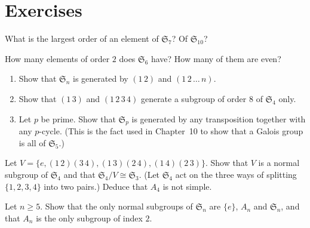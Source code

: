 \section{Exercises}

\begin{exercise}[$\star$]\label{ex:landau}
What is the largest order of an element of $\mathfrak S_7$? Of $\mathfrak S_{10}$?
\end{exercise}

\begin{exercise}[$\star$]\label{ex:order2}
How many elements of order $2$ does $\mathfrak S_6$ have? How many of them are even?
\end{exercise}

\begin{exercise}[$\star\star$]\label{ex:gens12n}
\begin{enumerate}[label=(\alph*)]
\item Show that $\mathfrak S_n$ is generated by $(1\,2)$ and $(1\,2\,\dots\,n)$.
\item Show that $(1\,3)$ and $(1\,2\,3\,4)$ generate a subgroup of order $8$ of $\mathfrak S_4$ only.
\item Let $p$ be prime. Show that $\mathfrak S_p$ is generated by any transposition together with any $p$-cycle. (This is the fact used in Chapter~10 to show that a Galois group is all of $\mathfrak S_5$.)
\end{enumerate}
\end{exercise}

\begin{exercise}[$\star\star$]\label{ex:v4}
Let $V=\{e,(1\,2)(3\,4),(1\,3)(2\,4),(1\,4)(2\,3)\}$. Show that $V$ is a normal subgroup of $\mathfrak S_4$ and that $\mathfrak S_4/V\cong\mathfrak S_3$. (Let $\mathfrak S_4$ act on the three ways of splitting $\{1,2,3,4\}$ into two pairs.) Deduce that $A_4$ is not simple.
\end{exercise}

\begin{exercise}[$\star\star$]\label{ex:normalSn}
Let $n\ge5$. Show that the only normal subgroups of $\mathfrak S_n$ are $\{e\}$, $A_n$ and $\mathfrak S_n$, and that $A_n$ is the only subgroup of index $2$.
\end{exercise}

